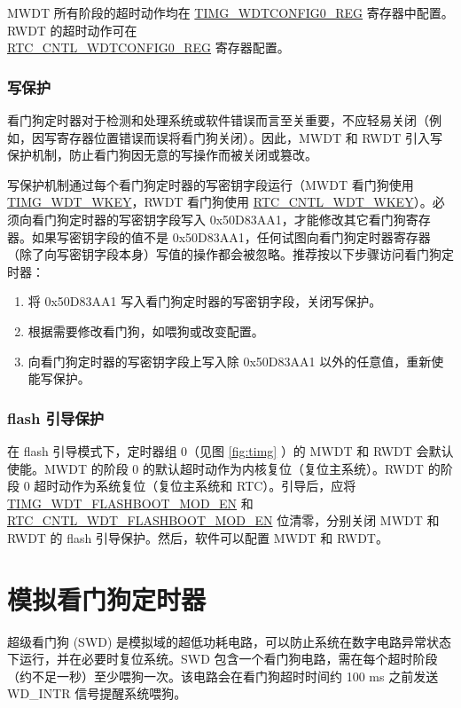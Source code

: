 \documentclass[main\_\_CN.tex]{subfiles}
\begin{document}
MWDT 所有阶段的超时动作均在 \hyperref[regdesc:TIMGWDTCONFIG0REG]{TIMG\_WDTCONFIG0\_REG} 寄存器中配置。RWDT 的超时动作可在 \\\hyperref[regdesc:RTCCNTLRTCWDTCONFIG0REG]{RTC\_CNTL\_WDTCONFIG0\_REG} 寄存器配置。

\subsubsection{写保护}
看门狗定时器对于检测和处理系统或软件错误而言至关重要，不应轻易关闭（例如，因写寄存器位置错误而误将看门狗关闭）。因此，MWDT 和 RWDT 引入写保护机制，防止看门狗因无意的写操作而被关闭或篡改。

写保护机制通过每个看门狗定时器的写密钥字段运行（MWDT 看门狗使用 \hyperref[fielddesc:TIMGWDTWKEY]{TIMG\_WDT\_WKEY}，RWDT 看门狗使用 \hyperref[fielddesc:RTCCNTLWDTWKEY]{RTC\_CNTL\_WDT\_WKEY}）。必须向看门狗定时器的写密钥字段写入 0x{}50D83AA1，才能修改其它看门狗寄存器。如果写密钥字段的值不是 0x{}50D83AA1，任何试图向看门狗定时器寄存器（除了向写密钥字段本身）写值的操作都会被忽略。推荐按以下步骤访问看门狗定时器：

\begin{enumerate}
\item 将 0x{}50D83AA1 写入看门狗定时器的写密钥字段，关闭写保护。
\item 根据需要修改看门狗，如喂狗或改变配置。
\item 向看门狗定时器的写密钥字段上写入除 0x{}50D83AA1 以外的任意值，重新使能写保护。
\end{enumerate}

\subsubsection{flash 引导保护}
在 flash 引导模式下，定时器组 0（见图 \ref{fig:timg} \textit{}）的 MWDT 和 RWDT 会默认使能。MWDT 的阶段 0 的默认超时动作为内核复位（复位主系统）。RWDT 的阶段 0 超时动作为系统复位（复位主系统和 RTC）。引导后，应将 \hyperref[fielddesc:TIMGWDTFLASHBOOTMODEN]{TIMG\_WDT\_FLASHBOOT\_MOD\_EN} 和 \hyperref[fielddesc:RTCCNTLWDTFLASHBOOTMODEN]{RTC\_CNTL\_WDT\_FLASHBOOT\_MOD\_EN} 位清零，分别关闭 MWDT 和 RWDT 的 flash 引导保护。然后，软件可以配置 MWDT 和 RWDT。

\section{模拟看门狗定时器}\label{sec:wdt-swdt}
超级看门狗 (SWD) 是模拟域的超低功耗电路，可以防止系统在数字电路异常状态下运行，并在必要时复位系统。SWD 包含一个看门狗电路，需在每个超时阶段（约不足一秒）至少喂狗一次。该电路会在看门狗超时时间约 100 ms 之前发送 WD\_INTR 信号提醒系统喂狗。
\end{document}
